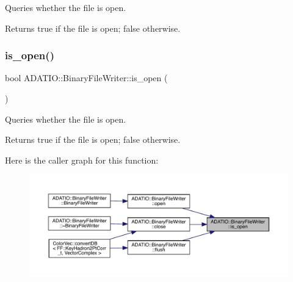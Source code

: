 Queries whether the file is open. 

\begin{DoxyReturn}{Returns}
true if the file is open; false otherwise. 
\end{DoxyReturn}
\mbox{\label{classADATIO_1_1BinaryFileWriter_a891f81b41b18e3ba86c7e8af134b603e}} 
\subsubsection{\texorpdfstring{is\_open()}{is\_open()}\hspace{0.1cm}{\footnotesize\ttfamily [3/3]}}
{\footnotesize\ttfamily bool A\+D\+A\+T\+I\+O\+::\+Binary\+File\+Writer\+::is\+\_\+open (\begin{DoxyParamCaption}{ }\end{DoxyParamCaption})}



Queries whether the file is open. 

\begin{DoxyReturn}{Returns}
true if the file is open; false otherwise. 
\end{DoxyReturn}
Here is the caller graph for this function\+:
\nopagebreak
\begin{figure}[H]
\begin{center}
\leavevmode
\includegraphics[width=350pt]{dc/d11/classADATIO_1_1BinaryFileWriter_a891f81b41b18e3ba86c7e8af134b603e_icgraph}
\end{center}
\end{figure}
\mbox{\label{classADATIO_1_1BinaryFileWriter_a943ba19816b403b36f50f72740ea856a}} 
